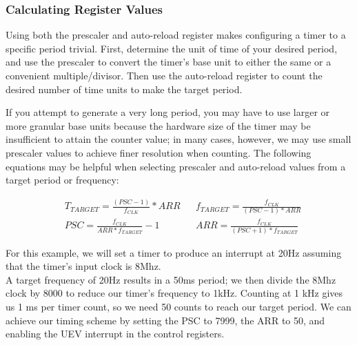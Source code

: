 \documentclass[openany,11pt,fleqn]{book} %
\begin{document}
    \subsubsection{Calculating Register Values}
        Using both the prescaler and auto-reload register makes configuring a timer to a specific period trivial. First, determine the unit of time of your desired period, and use the prescaler to convert the timer's base unit to either the same or a convenient multiple/divisor. Then use the auto-reload register to count the desired number of time units to make the target period. 
        
        If you attempt to generate a very long period, you may have to use larger or more granular base units because the hardware size of the timer may be insufficient to attain the counter value; in many cases, however, we may use small prescaler values to achieve finer resolution when counting.
        The following equations may be helpful when selecting prescaler and auto-reload values from a target period or frequency:
        
        \begin{align*}
            & T_{TARGET} = \frac{(PSC-1)}{f_{CLK}} * ARR & & f_{TARGET} = \frac{f_{CLK}}{(PSC-1) * ARR}\\[1em]
            & PSC = \frac{f_{CLK}}{ARR * f_{TARGET}}-1 & & ARR = \frac{f_{CLK}}{(PSC+1) * f_{TARGET}}
        \end{align*}
        	
            
        \begin{center}
            \begin{example} 
                \label{example1}
            For this example, we will set a timer to produce an interrupt at 20Hz assuming that the timer's input clock is 8Mhz. \\
            
            A target frequency of 20Hz results in a 50ms period; we then divide the 8Mhz clock by 8000 to reduce our timer's frequency to 1kHz. Counting at 1 kHz gives us 1 ms per timer count, so we need 50 counts to reach our target period. We can achieve our timing scheme by setting the PSC to 7999, the ARR to 50, and enabling the UEV interrupt in the control registers.  
            \end{example}
        \end{center}
        
\end{document}
